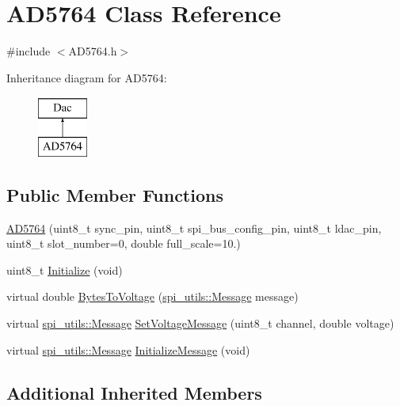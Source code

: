 \hypertarget{classAD5764}{}\section{A\+D5764 Class Reference}
\label{classAD5764}


{\ttfamily \#include $<$A\+D5764.\+h$>$}

Inheritance diagram for A\+D5764\+:\begin{figure}[H]
\begin{center}
\leavevmode
\includegraphics[height=2.000000cm]{classAD5764}
\end{center}
\end{figure}
\subsection*{Public Member Functions}
\begin{DoxyCompactItemize}
\item 
\mbox{\hyperlink{classAD5764_ab8644f724d2f0fbe25f4a181d2e315d6}{A\+D5764}} (uint8\+\_\+t sync\+\_\+pin, uint8\+\_\+t spi\+\_\+bus\+\_\+config\+\_\+pin, uint8\+\_\+t ldac\+\_\+pin, uint8\+\_\+t slot\+\_\+number=0, double full\+\_\+scale=10.)
\item 
uint8\+\_\+t \mbox{\hyperlink{classAD5764_ab98c5418cf46198dd4b967e143896a3a}{Initialize}} (void)
\item 
virtual double \mbox{\hyperlink{classAD5764_a729015992eda059ae615373d1db53823}{Bytes\+To\+Voltage}} (\mbox{\hyperlink{structspi__utils_1_1Message}{spi\+\_\+utils\+::\+Message}} message)
\item 
virtual \mbox{\hyperlink{structspi__utils_1_1Message}{spi\+\_\+utils\+::\+Message}} \mbox{\hyperlink{classAD5764_a62887ed89fedc4db68f2a54324e1fac0}{Set\+Voltage\+Message}} (uint8\+\_\+t channel, double voltage)
\item 
virtual \mbox{\hyperlink{structspi__utils_1_1Message}{spi\+\_\+utils\+::\+Message}} \mbox{\hyperlink{classAD5764_a02710f0508562f2a293dd6d706c0cc3c}{Initialize\+Message}} (void)
\end{DoxyCompactItemize}
\subsection*{Additional Inherited Members}


